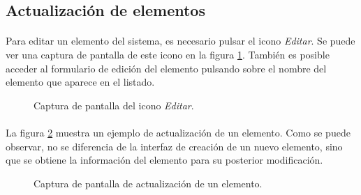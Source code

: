 \subsection{Actualización de elementos}

  \paragraph{}Para editar un elemento del sistema, es necesario pulsar el
  icono \textit{Editar}. Se puede ver una captura de pantalla de este
  icono en la figura \ref{capturaEditElemento}. También es posible acceder
  al formulario de edición del elemento pulsando sobre el nombre del elemento
  que aparece en el listado.

  \begin{figure}[!ht]
    \begin{center}
      \caption{Captura de pantalla del icono \textit{Editar}.}
      \label{capturaEditElemento}
    \end{center}
  \end{figure}

  \paragraph{}La figura \ref{capturaActualizacionElementos} muestra un ejemplo
  de actualización de un elemento. Como se puede observar, no se diferencia
  de la interfaz de creación de un nuevo elemento, sino que se obtiene la
  información del elemento para su posterior modificación.


  \begin{figure}[!ht]
    \begin{center}
      \caption{Captura de pantalla de actualización de un elemento.}
      \label{capturaActualizacionElementos}
    \end{center}
  \end{figure}
